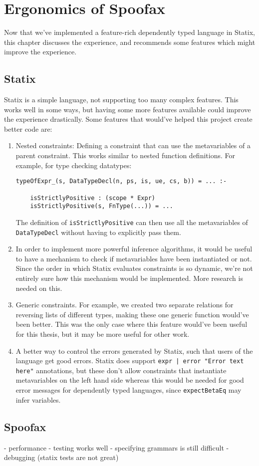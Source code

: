 \chapter{Ergonomics of Spoofax}

Now that we've implemented a feature-rich dependently typed language in Statix, this chapter discusses the experience, and recommends some features which might improve the experience. 

\section{Statix}

Statix is a simple language, not supporting too many complex features. This works well in some ways, but having some more features available could improve the experience drastically. Some features that would've helped this project create better code are:

\begin{enumerate}
	\item Nested constraints: Defining a constraint that can use the metavariables of a parent constraint. This works similar to nested function definitions. For example, for type checking datatypes:
	\begin{lstlisting}
typeOfExpr_(s, DataTypeDecl(n, ps, is, ue, cs, b)) = ... :-

	isStrictlyPositive : (scope * Expr)
	isStrictlyPositive(s, FnType(...)) = ...
	\end{lstlisting}
	The definition of \verb|isStrictlyPositive| can then use all the metavariables of \verb|DataTypeDecl| without having to explicitly pass them.
	
	\item In order to implement more powerful inference algorithms, it would be useful to have a mechanism to check if metavariables have been instantiated or not. Since the order in which Statix evaluates constraints is so dynamic, we're not entirely sure how this mechanism would be implemented. More research is needed on this.
	
	\item Generic constraints. For example, we created two separate relations for reversing lists of different types, making these one generic function would've been better. This was the only case where this feature would've been useful for this thesis, but it may be more useful for other work.
	
	\item A better way to control the errors generated by Statix, such that users of the language get good errors. Statix does support \texttt{expr | error "Error text here"} annotations, but these don't allow constraints that instantiate metavariables on the left hand side whereas this would be needed for good error messages for dependently typed languages, since \verb|expectBetaEq| may infer variables.
\end{enumerate}

\section{Spoofax}



- performance
- testing works well
- specifying grammars is still difficult
- debugging (statix tests are not great)